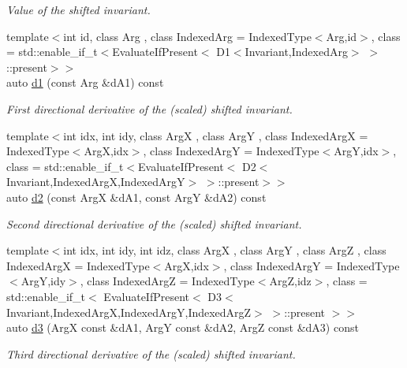\begin{DoxyCompactItemize}
\begin{DoxyCompactList}\small\item\em Value of the shifted invariant. \end{DoxyCompactList}\item 
{\footnotesize template$<$int id, class Arg , class Indexed\-Arg  = Indexed\-Type$<$\-Arg,id$>$, class  = std\-::enable\-\_\-if\-\_\-t$<$\-Evaluate\-If\-Present$<$ D1$<$\-Invariant,\-Indexed\-Arg$>$ $>$\-::present$>$$>$ }\\auto \hyperlink{classRFFGen_1_1LinearAlgebra_1_1ShiftedInvariant_a4e05a73ae9cb190aee5bcb02332e7f36}{d1} (const Arg \&d\-A1) const 
\begin{DoxyCompactList}\small\item\em First directional derivative of the (scaled) shifted invariant. \end{DoxyCompactList}\item 
{\footnotesize template$<$int idx, int idy, class Arg\-X , class Arg\-Y , class Indexed\-Arg\-X  = Indexed\-Type$<$\-Arg\-X,idx$>$, class Indexed\-Arg\-Y  = Indexed\-Type$<$\-Arg\-Y,idx$>$, class  = std\-::enable\-\_\-if\-\_\-t$<$\-Evaluate\-If\-Present$<$ D2$<$\-Invariant,\-Indexed\-Arg\-X,\-Indexed\-Arg\-Y$>$ $>$\-::present$>$$>$ }\\auto \hyperlink{classRFFGen_1_1LinearAlgebra_1_1ShiftedInvariant_a3b1be101997bae58dcb305d63fe90505}{d2} (const Arg\-X \&d\-A1, const Arg\-Y \&d\-A2) const 
\begin{DoxyCompactList}\small\item\em Second directional derivative of the (scaled) shifted invariant. \end{DoxyCompactList}\item 
{\footnotesize template$<$int idx, int idy, int idz, class Arg\-X , class Arg\-Y , class Arg\-Z , class Indexed\-Arg\-X  = Indexed\-Type$<$\-Arg\-X,idx$>$, class Indexed\-Arg\-Y  = Indexed\-Type$<$\-Arg\-Y,idy$>$, class Indexed\-Arg\-Z  = Indexed\-Type$<$\-Arg\-Z,idz$>$, class  = std\-::enable\-\_\-if\-\_\-t$<$ Evaluate\-If\-Present$<$ D3$<$\-Invariant,\-Indexed\-Arg\-X,\-Indexed\-Arg\-Y,\-Indexed\-Arg\-Z$>$ $>$\-::present $>$$>$ }\\auto \hyperlink{classRFFGen_1_1LinearAlgebra_1_1ShiftedInvariant_a2467e5007ac8d84d11c1f68c15db03a4}{d3} (Arg\-X const \&d\-A1, Arg\-Y const \&d\-A2, Arg\-Z const \&d\-A3) const 
\begin{DoxyCompactList}\small\item\em Third directional derivative of the (scaled) shifted invariant. \end{DoxyCompactList}\end{DoxyCompactItemize}


